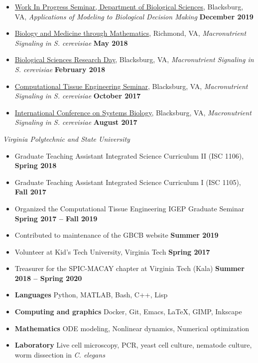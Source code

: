 \begin{itemize}
\item \ul{Work In Progress Seminar, Department of Biological Sciences}, Blacksburg, VA, \textit{Applications of Modeling to Biological Decision Making} \textbf{December 2019}
  \item \ul{Biology and  Medicine through Mathematics}, Richmond, VA, \textit{Macronutrient Signaling in S. cerevisiae} \textbf{May 2018}  
  \item \ul{Biological Sciences Research Day}, Blacksburg, VA, \textit{Macronutrient Signaling in S. cerevisiae} \textbf{February 2018}
  \item \ul{Computational Tissue Engineering Seminar}, Blacksburg, VA, \textit{Macronutrient Signaling in S. cerevisiae} \textbf{October 2017}
  \item \ul{International Conference on Systems Biology}, Blacksburg, VA, \textit{Macronutrient Signaling in S. cerevisiae} \textbf{August 2017}
\end{itemize}

\textit{Virginia Polytechnic and State University}
\begin{itemize}
  \item Graduate Teaching Assistant Integrated Science Curriculum II (ISC 1106), \textbf{Spring 2018}
  \item Graduate Teaching Assistant Integrated Science Curriculum I (ISC 1105), \textbf{Fall 2017}
\end{itemize}

\begin{itemize}
\item Organized the Computational Tissue Engineering IGEP Graduate Seminar \textbf{Spring 2017 -- Fall 2019}  
\item Contributed to maintenance of the GBCB website \textbf{Summer 2019}
\item Volunteer at Kid's Tech University, Virginia Tech \textbf{Spring 2017}    
\item Treasurer for the SPIC-MACAY chapter at Virginia Tech (Kala)  \textbf{Summer 2018 -- Spring 2020}  
\end{itemize}

\begin{itemize}
\item \textbf{Languages} Python, MATLAB,  Bash, C++, Lisp
\item \textbf{Computing and graphics} Docker, Git, Emacs, \LaTeX, GIMP, Inkscape
\item \textbf{Mathematics} ODE modeling, Nonlinear dynamics, Numerical optimization
\item \textbf{Laboratory} Live cell microscopy, PCR, yeast cell culture, nematode culture, worm dissection in \textit{C. elegans}
\end{itemize}


